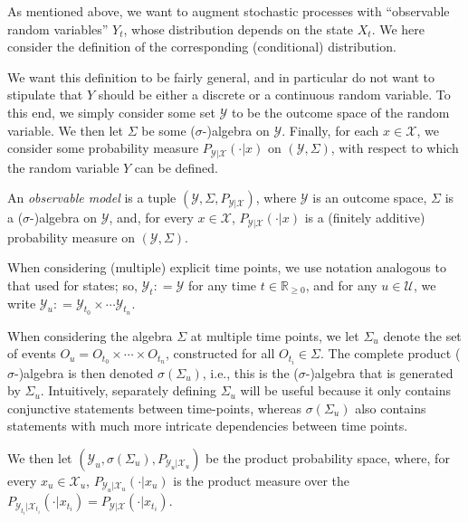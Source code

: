 \documentclass[twoside,11pt]{article}
\newcommand{\reals}{\mathbb{R}}
\newcommand{\realsnonneg}{\reals_{\geq 0}}
\newcommand{\states}{\mathcal{X}}
\newcommand{\observs}{\mathcal{Y}}
\newcommand{\coloneqq}{:\!=}
\begin{document}
As mentioned above, we want to augment stochastic processes with ``observable random variables'' $Y_t$, whose distribution depends on the state $X_t$. We here consider the definition of the corresponding (conditional) distribution.

We want this definition to be fairly general, and in particular do not want to stipulate that $Y$ should be either a discrete or a continuous random variable. To this end, we simply consider some set $\observs$ to be the outcome space of the random variable. We then let $\Sigma$ be some ($\sigma$-)algebra on $\observs$. Finally, for each $x\in\states$, we consider some probability measure $P_{\observs\vert\states}(\cdot\vert x)$ on $(\observs,\Sigma)$, with respect to which the random variable $Y$ can be defined.

\begin{definition}
An \emph{observable model} is a tuple $(\observs,\Sigma,P_{\observs\vert \states})$, where $\observs$ is an outcome space, $\Sigma$ is a ($\sigma$-)algebra on $\observs$, and, for every $x\in\states$, $P_{\observs\vert\states}(\cdot\vert x)$ is a (finitely additive) probability measure on $(\observs,\Sigma)$.
\end{definition}

When considering (multiple) explicit time points, we use notation analogous to that used for states; so, $\observs_t\coloneqq\observs$ for any time $t\in\realsnonneg$, and for any $u\in\mathcal{U}$, we write $\observs_u\coloneqq \observs_{t_0}\times\cdots\observs_{t_n}$. 

When considering the algebra $\Sigma$ at multiple time points, we let $\Sigma_u$ denote the set of events $O_u=O_{t_0}\times\cdots\times O_{t_n}$, constructed for all $O_{t_i}\in\Sigma$. The complete product ($\sigma$-)algebra is then denoted $\sigma(\Sigma_u)$, i.e., this is the ($\sigma$-)algebra that is generated by $\Sigma_u$. Intuitively, separately defining $\Sigma_u$ will be useful because it only contains conjunctive statements between time-points, whereas $\sigma(\Sigma_u)$ also contains statements with much more intricate dependencies between time points.

We then let $(\observs_u,\sigma(\Sigma_u),P_{\observs_u\vert\states_u})$ be the product probability space, where, for every $x_u\in\states_u$, $P_{\observs_u\vert\states_u}(\cdot\vert x_u)$ is the product measure over the $P_{\observs_{t_i}\vert\states_{t_i}}(\cdot\vert x_{t_i})=P_{\observs\vert\states}(\cdot\vert x_{t_i})$.
\end{document}
